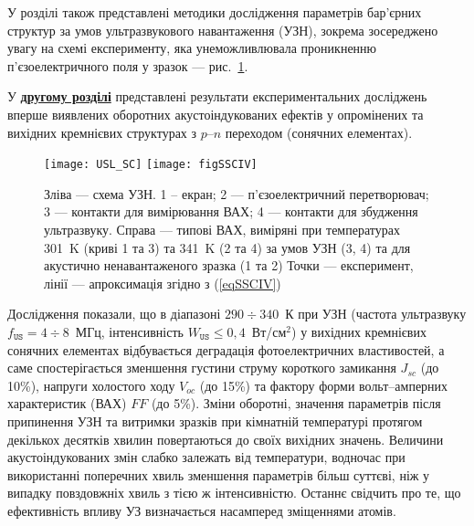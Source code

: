 У розділі також представлені методики дослідження параметрів бар'єрних структур за умов ультразвукового навантаження (УЗН),
зокрема зосереджено увагу на схемі експерименту, яка унеможливлювала проникненню п'єзоелектричного поля у зразок --- рис.~\ref{USL_SC}.

У  \underline{\textbf{другому розділі}} представлені результати експериментальних досліджень вперше виявлених оборотних акустоіндукованих ефектів у опромінених та вихідних кремнієвих структурах з  $p$--$n$ переходом (сонячних елементах).

\begin{figure}[b]
\center
\texttt{[image: USL\_SC]} \hfill
\texttt{[image: figSSCIV]}
\caption{\label{USL_SC}
Зліва --- схема УЗН.
1 --  екран;
2 --- п'єзоелектричний перетворювач;
3 --- контакти для вимірювання ВАХ;
4 --- контакти для збудження ультразвуку.
Справа --- типові ВАХ, виміряні при температурах 301~K (криві 1 та 3) та 341~K (2 та 4)
за умов УЗН (3, 4) та для акустично ненавантаженого зразка (1 та 2)
Точки --- експеримент, лінії --- апроксимація згідно з (\ref{eqSSCIV})
}%
\end{figure}

 Дослідження показали, що
   в діапазоні $290\div340$~К при УЗН (частота ультразвуку $f_\mathtt{US}=4\div8$~МГц, інтенсивність $W_\mathtt{US}\leq0,4$~Вт/см$^2$) у вихідних кремнієвих сонячних елементах  відбувається деградація
фотоелектричних властивостей, а саме
спостерігається зменшення густини струму короткого замикання $J_{sc}$ (до 10\%), напруги холостого ходу $V_{oc}$ (до 15\%) та фактору форми вольт--амперних характеристик (ВАХ) $F\!F$ (до 5\%).
Зміни оборотні, значення параметрів  після припинення УЗН  та витримки зразків при кімнатній температурі протягом декількох десятків хвилин повертаються до своїх вихідних значень.
Величини акустоіндукованих змін слабко залежать від температури, водночас при використанні поперечних хвиль зменшення параметрів більш суттєві, ніж у випадку повздовжніх хвиль з тією ж інтенсивністю.
Останнє свідчить про те, що ефективність впливу УЗ визначається насамперед зміщеннями атомів.

